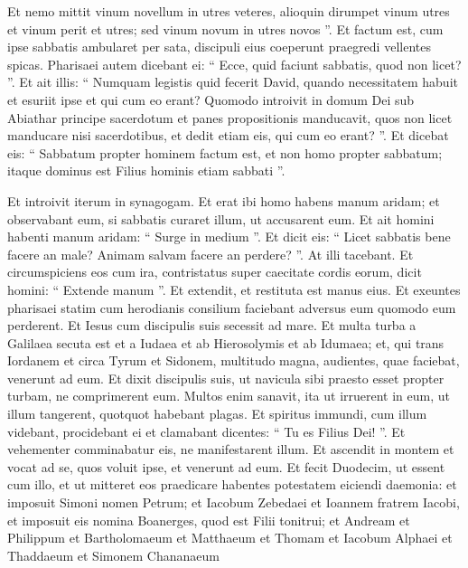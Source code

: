 \begin{biblechapter}
\begin{biblechapter}
\verse Et nemo mittit vinum novellum in utres veteres, alioquin dirumpet vinum utres et vinum perit et utres; sed vinum novum in utres novos ”.
 \verse Et factum est, cum ipse sabbatis ambularet per sata, discipuli eius coeperunt praegredi vellentes spicas. 
\verse Pharisaei autem dicebant ei: “ Ecce, quid faciunt sabbatis, quod non licet? ”. 
\verse Et ait illis: “ Numquam legistis quid fecerit David, quando necessitatem habuit et esuriit ipse et qui cum eo erant? 
\verse Quomodo introivit in domum Dei sub Abiathar principe sacerdotum et panes propositionis manducavit, quos non licet manducare nisi sacerdotibus, et dedit etiam eis, qui cum eo erant? ”. 
\verse Et dicebat eis: “ Sabbatum propter hominem factum est, et non homo propter sabbatum; 
\verse itaque dominus est Filius hominis etiam sabbati ”.
 
\begin{biblechapter}
\verse Et introivit iterum in synagogam. Et erat ibi homo habens manum aridam; 
\verse et observabant eum, si sabbatis curaret illum, ut accusarent eum. 
\verse Et ait homini habenti manum aridam: “ Surge in medium ”. 
\verse Et dicit eis: “ Licet sabbatis bene facere an male? Animam salvam facere an perdere? ”. At illi tacebant. 
\verse Et circumspiciens eos cum ira, contristatus super caecitate cordis eorum, dicit homini: “ Extende manum ”. Et extendit, et restituta est manus eius. 
\verse Et exeuntes pharisaei statim cum herodianis consilium faciebant adversus eum quomodo eum perderent.
 \verse Et Iesus cum discipulis suis secessit ad mare. Et multa turba a Galilaea secuta est et a Iudaea 
\verse et ab Hierosolymis et ab Idumaea; et, qui trans Iordanem et circa Tyrum et Sidonem, multitudo magna, audientes, quae faciebat, venerunt ad eum. 
\verse Et dixit discipulis suis, ut navicula sibi praesto esset propter turbam, ne comprimerent eum.
 \verse Multos enim sanavit, ita ut irruerent in eum, ut illum tangerent, quotquot habebant plagas. 
\verse Et spiritus immundi, cum illum videbant, procidebant ei et clamabant dicentes: “ Tu es Filius Dei! ”. 
\verse Et vehementer comminabatur eis, ne manifestarent illum.
 \verse Et ascendit in montem et vocat ad se, quos voluit ipse, et venerunt ad eum. 
\verse Et fecit Duodecim, ut essent cum illo, et ut mitteret eos praedicare 
 \verse habentes potestatem eiciendi daemonia: 
\verse et imposuit Simoni nomen Petrum; 
\verse et Iacobum Zebedaei et Ioannem fratrem Iacobi, et imposuit eis nomina Boanerges, quod est Filii tonitrui; 
\verse et Andream et Philippum et Bartholomaeum et Matthaeum et Thomam et Iacobum Alphaei et Thaddaeum et Simonem Chananaeum 

\end{biblechapter}
\end{biblechapter}
\end{biblechapter}
